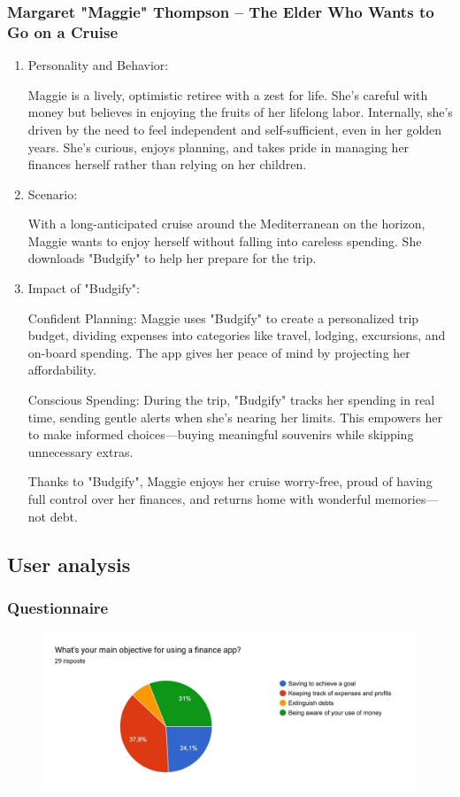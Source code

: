 \documentclass[a4paper,12pt]{article}
\begin{document}
\subsubsection{Margaret "Maggie" Thompson – The Elder Who Wants to Go on a Cruise}
\begin{enumerate}
    \item Personality and Behavior:
    
    Maggie is a lively, optimistic retiree with a zest for life. She’s careful with money but believes in enjoying the fruits of her lifelong labor. Internally, she’s driven by the need to feel independent and self-sufficient, even in her golden years. She's curious, enjoys planning, and takes pride in managing her finances herself rather than relying on her children.
    
    \item Scenario:
    
    With a long-anticipated cruise around the Mediterranean on the horizon, Maggie wants to enjoy herself without falling into careless spending. She downloads "Budgify" to help her prepare for the trip.
    
    \item Impact of "Budgify":
    
    Confident Planning: Maggie uses "Budgify" to create a personalized trip budget, dividing expenses into categories like travel, lodging, excursions, and on-board spending. The app gives her peace of mind by projecting her affordability.
    
    Conscious Spending: During the trip, "Budgify" tracks her spending in real time, sending gentle alerts when she’s nearing her limits. This empowers her to make informed choices—buying meaningful souvenirs while skipping unnecessary extras.
    
    Thanks to "Budgify", Maggie enjoys her cruise worry-free, proud of having full control over her finances, and returns home with wonderful memories—not debt.
\end{enumerate}
\subsection{User analysis}

\subsubsection{Questionnaire}

\begin{figure}[H]
    \centering
    \includegraphics[width=\linewidth]{imagequest1.jpg}
\end{figure}
\end{document}
